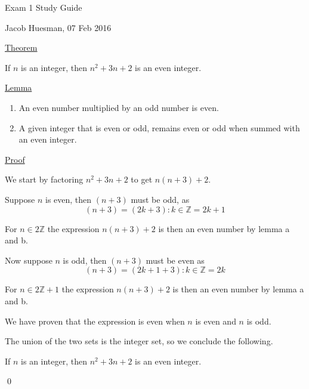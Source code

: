 \documentclass{article}
\begin{document}
\centerline{\sc \large Exam 1 Study Guide}
\vspace{.5pc}
\centerline{\sc Jacob Huesman, 07 Feb 2016}

\vspace{2pc}

\underline{Theorem}
\begin{addmargin}[0.75cm]{0cm}
	If $n$ is an integer, then $n^2 + 3n + 2$ is an even integer.
\end{addmargin}

\underline{Lemma}
\renewcommand{\labelenumi}{(\alph{enumi})}
\begin{enumerate}[leftmargin=1.35cm]
	\item An even number multiplied by an odd number is even.
	\item A given integer that is even or odd, remains even or odd when summed with an even integer.
\end{enumerate}

\underline{Proof}
\begin{addmargin}[0.75cm]{0cm}
	We start by factoring $n^2 + 3n +2$ to get $n(n+3)+2$.
	
	Suppose $n$ is even, then $(n+3)$ must be odd, as 
	\begin{equation}
		(n+3)=(2k+3):k\in\mathbb{Z}=2k+1
	\end{equation}
	
	For $n \in 2\mathbb{Z}$ the expression $n(n+3)+2$ is then an even number by lemma a and b.
	
	Now suppose $n$ is odd, then $(n+3)$ must be even as 
	\begin{equation}
		(n+3)=(2k+1+3): k \in \mathbb{Z}=2k
	\end{equation}
	
	For $n \in 2\mathbb{Z}+1$ the expression $n(n+3)+2$ is then an even number by lemma a and b.
	
	We have proven that the expression is even when $n$ is even and $n$ is odd.
	
	The union of the two sets is the integer set, so we conclude the following.
	
	If $n$ is an integer, then $n^2 + 3n + 2$ is an even integer.
			
	\qed
\end{addmargin}
\end{document}
